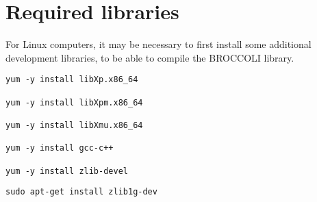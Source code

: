 \section{Required libraries}

For Linux computers, it may be necessary to first install some additional development libraries, to be able to compile the BROCCOLI library.

\begin{verbatim}
yum -y install libXp.x86_64

yum -y install libXpm.x86_64

yum -y install libXmu.x86_64
 
yum -y install gcc-c++
 
yum -y install zlib-devel
\end{verbatim}

\begin{verbatim}
sudo apt-get install zlib1g-dev
\end{verbatim}




